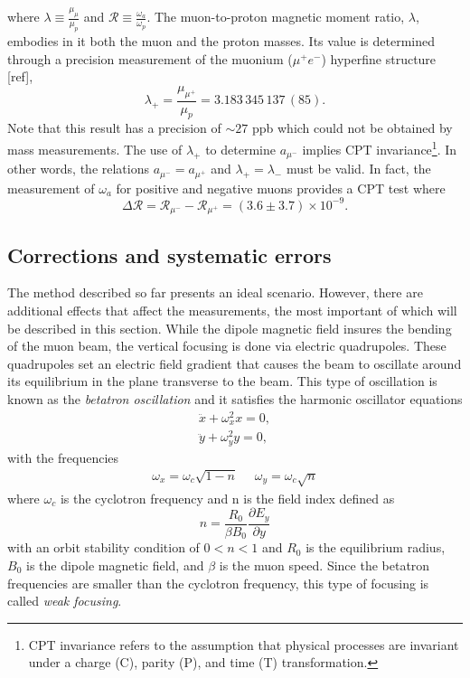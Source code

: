 \documentclass{outhesis}
\begin{document}
where $\displaystyle \lambda \equiv \frac{\mu_{\mu}}{\mu_{p}}$ and $\displaystyle \mathcal{R} \equiv \frac{\omega_a}{\omega_p}$.
The muon-to-proton magnetic moment ratio, $\lambda$, embodies in it both the muon and the proton masses. Its value is determined through a precision measurement of the muonium ($\mu^+e^-$) hyperfine structure [ref],
\[\lambda_+ = \frac{\mu_{\mu^+}}{\mu_{p}} = 3.183\, 345\, 137\, (85).\]
Note that this result has a precision of $\sim 27$ ppb which could not be obtained by mass measurements. The use of $\lambda_+$ to determine $a_{\mu^-}$ implies CPT invariance\footnote{CPT invariance refers to the assumption that physical processes are invariant under a charge (C), parity (P), and time (T) transformation.}. In other words, the relations $a_{\mu^-} = a_{\mu^+}$ and $\lambda_+ = \lambda_-$ must be valid. In fact, the measurement of $\omega_a$ for positive and negative muons provides a CPT test where 
\begin{equation}
\Delta \mathcal{R} = \mathcal{R}_{\mu^-} - \mathcal{R}_{\mu^+} = \left(3.6 \pm 3.7 \right) \times 10^{-9}.
\end{equation}

\subsection{Corrections and systematic errors}

The method described so far presents an ideal scenario. However, there are additional effects that affect the measurements, the most important of which will be described in this section.  
While the dipole magnetic field insures the bending of the muon beam, the vertical focusing is done via electric quadrupoles. These quadrupoles set an electric field gradient that causes the beam to oscillate around its equilibrium in the plane transverse to the beam. This type of oscillation is known as the \emph{betatron oscillation} and it satisfies the harmonic oscillator equations 
\begin{equation}
\begin{split}
\ddot{x} + \omega_x^2 x = 0, \\
\ddot{y} + \omega_y^2 y = 0,
\end{split}
\end{equation}
with the frequencies 
\begin{equation}
\begin{split}
\omega_x = \omega_c\sqrt{1-n} \,\,\,\,\,\,\,\,
\omega_y = \omega_c\sqrt{n}
\end{split}
\end{equation}
where $ \omega_c$ is the cyclotron frequency and n is the field index defined as 
\begin{equation}
n = \frac{R_0}{\beta B_0}\frac{\partial E_y}{\partial y}
\end{equation}
with an orbit stability condition of $0<n<1$ and $R_0$ is the equilibrium radius, $B_0$ is the dipole magnetic field, and $\beta$ is the muon speed. Since the betatron frequencies are smaller than the cyclotron frequency, this type of focusing is called \emph{weak focusing}.
 
\end{document}
